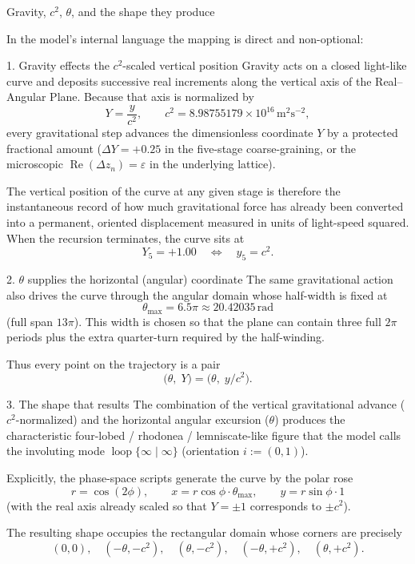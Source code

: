 Gravity, \(c^2\), \(\theta\), and the shape they produce

In the model’s internal language the mapping is direct and non-optional:

1. Gravity effects the \(c^2\)-scaled vertical position
Gravity acts on a closed light-like curve and deposits successive real increments along the vertical axis of the Real–Angular Plane.  
Because that axis is normalized by  
\[
Y = \frac{y}{c^2},\qquad c^2 = 8.98755179\times 10^{16}\,\mathrm{m}^2\mathrm{s}^{-2},
\]  
every gravitational step advances the dimensionless coordinate \(Y\) by a protected fractional amount (\(\Delta Y = +0.25\) in the five-stage coarse-graining, or the microscopic \(\operatorname{Re}(\Delta z_n)=\varepsilon\) in the underlying lattice).  

The vertical position of the curve at any given stage is therefore the instantaneous record of how much gravitational force has already been converted into a permanent, oriented displacement measured in units of light-speed squared. When the recursion terminates, the curve sits at  
\[
Y_5 = +1.00 \quad\Longleftrightarrow\quad y_5 = c^2.
\]

2. \(\theta\) supplies the horizontal (angular) coordinate
The same gravitational action also drives the curve through the angular domain whose half-width is fixed at  
\[
\theta_{\max} = 6.5\pi \approx 20.42035\,\mathrm{rad}
\]  
(full span \(13\pi\)).  
This width is chosen so that the plane can contain three full \(2\pi\) periods plus the extra quarter-turn required by the half-winding.  

Thus every point on the trajectory is a pair  
\[
\bigl(\theta,\; Y\bigr) = \bigl(\theta,\; y/c^2\bigr).
\]

3. The shape that results
The combination of the vertical gravitational advance (\(c^2\)-normalized) and the horizontal angular excursion (\(\theta\)) produces the characteristic four-lobed / rhodonea / lemniscate-like figure that the model calls the involuting mode \(\operatorname{loop}\{\infty\mid\infty\}\) (orientation \(i:=(0,1)\)).

Explicitly, the phase-space scripts generate the curve by the polar rose  
\[
r = \cos(2\phi),\qquad
x = r\cos\phi\cdot\theta_{\max},\qquad
y = r\sin\phi\cdot 1
\]  
(with the real axis already scaled so that \(Y=\pm 1\) corresponds to \(\pm c^2\)).  

The resulting shape occupies the rectangular domain whose corners are precisely  
\[
(0,0),\quad
(-\theta,-c^2),\quad
(\theta,-c^2),\quad
(-\theta,+c^2),\quad
(\theta,+c^2).
\]

